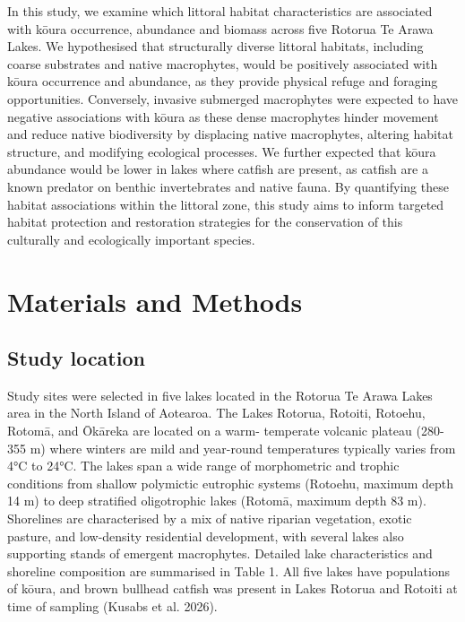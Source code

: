 \documentclass[
  12pt,
  a4paper,
  oneside]{scrbook}
\begin{document}
In this study, we examine which littoral habitat characteristics are
associated with kōura occurrence, abundance and biomass across five
Rotorua Te Arawa Lakes. We hypothesised that structurally diverse
littoral habitats, including coarse substrates and native macrophytes,
would be positively associated with kōura occurrence and abundance, as
they provide physical refuge and foraging opportunities. Conversely,
invasive submerged macrophytes were expected to have negative
associations with kōura as these dense macrophytes hinder movement and
reduce native biodiversity by displacing native macrophytes, altering
habitat structure, and modifying ecological processes. We further
expected that kōura abundance would be lower in lakes where catfish are
present, as catfish are a known predator on benthic invertebrates and
native fauna. By quantifying these habitat associations within the
littoral zone, this study aims to inform targeted habitat protection and
restoration strategies for the conservation of this culturally and
ecologically important species.

\section{Materials and Methods}\label{materials-and-methods-1}

\subsection{Study location}\label{study-location}

Study sites were selected in five lakes located in the Rotorua Te Arawa
Lakes area in the North Island of Aotearoa. The Lakes Rotorua, Rotoiti,
Rotoehu, Rotomā, and Ōkāreka are located on a warm- temperate volcanic
plateau (280-355 m) where winters are mild and year-round temperatures
typically varies from 4°C to 24°C. The lakes span a wide range of
morphometric and trophic conditions from shallow polymictic eutrophic
systems (Rotoehu, maximum depth 14 m) to deep stratified oligotrophic
lakes (Rotomā, maximum depth 83 m). Shorelines are characterised by a
mix of native riparian vegetation, exotic pasture, and low-density
residential development, with several lakes also supporting stands of
emergent macrophytes. Detailed lake characteristics and shoreline
composition are summarised in Table 1. All five lakes have populations
of kōura, and brown bullhead catfish was present in Lakes Rotorua and
Rotoiti at time of sampling (Kusabs et al. 2026).
\end{document}
